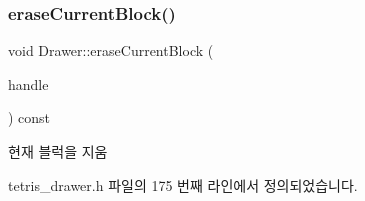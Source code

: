 \subsubsection{\texorpdfstring{erase\+Current\+Block()}{eraseCurrentBlock()}}
{\footnotesize\ttfamily void Drawer\+::erase\+Current\+Block (\begin{DoxyParamCaption}\item[{const \mbox{\hyperlink{class_block_handler}{Block\+Handler}} \&}]{handle }\end{DoxyParamCaption}) const\hspace{0.3cm}{\ttfamily [inline]}}



현재 블럭을 지움 



tetris\+\_\+drawer.\+h 파일의 175 번째 라인에서 정의되었습니다.


